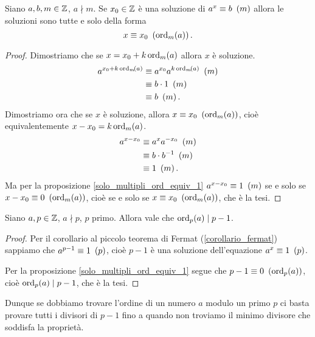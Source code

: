 \begin{proposition}
    Siano $a, b, m \in \Z$, $a \nmid m$. Se $x_0 \in \Z$ è una soluzione di $a^x \equiv b \Mod{m}$ allora le soluzioni sono tutte e solo della forma \begin{equation}
        x \equiv x_0 \Mod{\ord{a}{m}}.
    \end{equation}
\end{proposition}
\begin{proof}
    Dimostriamo che se $x = x_0 + k\ord{a}{m}$ allora $x$ è soluzione.
    \begin{alignat*}
        {1}
        a^{x_0 + k\ord{a}{m}} &\equiv a^{x_0}a^{k\ord{a}{m}} \Mod{m} \\
        &\equiv b \cdot 1 \Mod{m} \\
        &\equiv b \Mod{m}.
    \end{alignat*}
    Dimostriamo ora che se $x$ è soluzione, allora $x \equiv x_0 \Mod{\ord{a}{m}}$, cioè equivalentemente $x - x_0 = k\ord{a}{m}$.
    \begin{alignat*}
        {1}
        a^{x - x_0} &\equiv a^{x}a^{-x_0} \Mod{m} \\
        &\equiv b \cdot b^{-1} \Mod{m} \\
        &\equiv 1 \Mod{m}.
    \end{alignat*}
    Ma per la proposizione \ref{solo_multipli_ord_equiv_1} $a^{x - x_0} \equiv 1 \Mod{m}$ se e solo se $x - x_0 \equiv 0 \Mod{\ord{a}{m}}$, cioè se e solo se $x \equiv x_0 \Mod{\ord{a}{m}}$, che è la tesi.
\end{proof}

\begin{proposition}
    Siano $a, p \in \Z$, $a \nmid p$, $p$ primo. Allora vale che $\ord{a}{p} \divides p-1$.
\end{proposition}
\begin{proof}
    Per il corollario al piccolo teorema di Fermat (\ref{corollario_fermat}) sappiamo che $a^{p-1} \equiv 1 \Mod{p}$, cioè $p-1$ è una soluzione dell'equazione $a^x \equiv 1 \Mod{p}$. 
    
    Per la proposizione \ref{solo_multipli_ord_equiv_1} segue che $p-1 \equiv 0 \Mod{\ord{a}{p}}$, cioè $\ord{a}{p} \mid p-1$, che è la tesi.
\end{proof}

Dunque se dobbiamo trovare l'ordine di un numero $a$ modulo un primo $p$ ci basta provare tutti i divisori di $p - 1$ fino a quando non troviamo il minimo divisore che soddisfa la proprietà.

